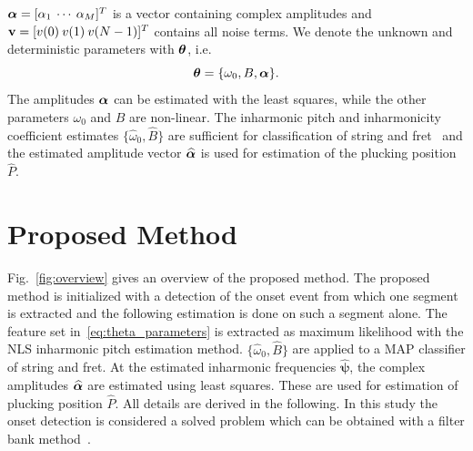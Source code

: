 \documentclass{article}
\begin{document}
$\text{\boldmath$\alpha$} = [\alpha_1 \: \cdots \: \alpha_M]^T$ is a vector containing complex amplitudes and $\mathbf v = [v(0) \: v(1) \: v(N-1)]^T$ contains all noise terms. We denote the unknown and deterministic parameters with $\text{\boldmath$\theta$}$, i.e.
\begin{equation}\label{eq:theta_parameters}
  \text{\boldmath$\theta$} = \{\omega_0, B, \text{\boldmath$\alpha$}\}.
\end{equation}
The amplitudes $\text{\boldmath$\alpha$}$ can be estimated with the least squares, while the other parameters $\omega_0$ and $B$ are non-linear. 
The inharmonic pitch and inharmonicity coefficient estimates $\{\widehat\omega_0, \widehat B \} $ are sufficient for classification of string and fret~\cite{barbancho:inharmonicity_tablature,michelson2018_aes} and the estimated amplitude vector $\text{\boldmath${\widehat\alpha}$}$ is used for estimation of the plucking position $\widehat{P}$.%
%     
%
%
%
%
%
\section{Proposed Method} %
\label{sec:proposed_method}
\vspace{-.6mm}
Fig.~\ref{fig:overview} gives an overview of the proposed method. The proposed method is initialized with a detection of the onset event from which one segment is extracted and the following estimation is done on such a segment alone. The feature set in~\eqref{eq:theta_parameters} is extracted as maximum likelihood with the NLS inharmonic pitch estimation method. $\{\widehat\omega_0, \widehat B \} $ are applied to a MAP classifier of string and fret. At the estimated inharmonic frequencies $\widehat{\boldsymbol{\psi}}$, the complex amplitudes $\text{\boldmath${\widehat\alpha}$}$ are estimated using least squares. These are used for estimation of plucking position $\widehat{P}$. All details are derived in the following.
In this study the onset detection is considered a solved problem which can be obtained with a filter bank method~\cite{olivier:mirtoolbox_dafx}.%
%
%
%
%
\end{document}
